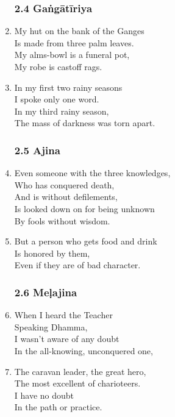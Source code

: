 \documentclass[10pt, openany]{book}
\begin{document}
\begin{enumerate}
\subsubsection*{2.4 Gaṅgātīriya}

\item My hut on the bank of the Ganges\\
Is made from three palm leaves.\\
My alms-bowl is a funeral pot,\\
My robe is castoff rags.

\item In my first two rainy seasons\\
I spoke only one word.\\
In my third rainy season,\\
The mass of darkness was torn apart.

\subsubsection*{2.5 Ajina}

\item Even someone with the three knowledges,\\
Who has conquered death, \\
And is without defilements,\\
Is looked down on for being unknown\\
By fools without wisdom.

\item But a person who gets food and drink\\
Is honored by them,\\
Even if they are of bad character.

\subsubsection*{2.6 Meḷajina}

\item When I heard the Teacher\\
Speaking Dhamma,\\
I wasn’t aware of any doubt\\
In the all-knowing, unconquered one,

\item The caravan leader, the great hero,\\
The most excellent of charioteers.\\
I have no doubt\\
In the path or practice.


\end{enumerate}
\end{document}
